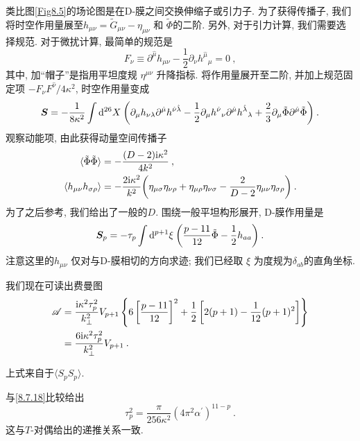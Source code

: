类比图\ref{Fig8.5}的场论图是在D-膜之间交换伸缩子或引力子. 为了获得传播子, 
我们将时空作用量展至$h_{\mu\nu}=\tilde{G}_{\mu\nu}-\eta_{\mu\nu}$ 和 $\tilde{\Phi}$的二阶. 
另外, 对于引力计算, 我们需要选择规范. 对于微扰计算, 最简单的规范是
\begin{equation}
	F_{\nu} \equiv \partial^{\hat{\mu}} h_{\mu \nu}-\frac{1}{2} \partial_{\nu} h^{\hat{\mu}}{}_{\mu}=0 \:, \label{8.7.21}
\end{equation}
其中, 加``帽子''是指用平坦度规 $\eta^{\mu \nu}$ 升降指标. 将作用量展开至二阶, 并加上规范固定项 $-F_{\nu} F^{\hat{\nu}} / 4\kappa^{2}$, 
时空作用量变成
\begin{equation}
	\bm{S}=-\frac{1}{8 \kappa^{2}} \int \mathrm{d}^{26} X \: \biggl( \partial_{\mu} h_{\nu \lambda} 
	\partial^{\hat{\mu}} h^{\hat{\nu} \hat{\lambda}}-\frac{1}{2} \partial_{\mu} h^{\hat{\nu}}{}_{\nu} 
	\partial^{\hat{\mu}} h^{\hat{\lambda}}{}_{\lambda}+\frac{2}{3} \partial_{\mu} \tilde{\Phi} \partial^{\hat{\mu}} \tilde{\Phi}\biggr) \:. \label{8.7.22}
\end{equation}
观察动能项, 由此获得动量空间传播子
\begin{subequations} \label{8.7.23}
\begin{align}
		\langle\tilde{\Phi} \tilde{\Phi}\rangle &=-\frac{(D-2) \mathrm{i} \kappa^{2}}{4 k^{2}}  \:, \label{8.7.23a} \\
		\langle h_{\mu \nu} h_{\sigma \rho}\rangle &=-\frac{2 \mathrm{i} \kappa^{2}}{k^{2}}
		\biggl(\eta_{\mu \sigma} \eta_{\nu \rho}+\eta_{\mu \rho} \eta_{\nu \sigma}-\frac{2}{D-2} \eta_{\mu \nu} \eta_{\sigma \rho}\biggr) \:. \label{8.7.23b}
\end{align}
\end{subequations}
为了之后参考, 我们给出了一般的$D$. 围绕一般平坦构形展开, D-膜作用量是
\begin{equation}
	\bm{S}_{p}=-\tau_{p} \int \mathrm{d}^{p+1} \xi \: \biggl(\frac{p-11}{12} \tilde{\Phi}-\frac{1}{2} h_{aa}\biggr) \:. \label{8.7.24}
\end{equation}
注意这里的$h_{\mu \nu}$ 仅对与D-膜相切的方向求迹; 我们已经取 $\xi$ 为度规为$\delta_{ab}$的直角坐标.

我们现在可读出费曼图
\begin{align}
	\mathscr{A} &= \frac{\mathrm{i} \kappa^{2} \tau_{p}^{2}}{k_{\perp}^{2}} V_{p+1} 
				   \left\{6\left[\frac{p-11}{12}\right]^{2}+\frac{1}{2}\left[2(p+1)-\frac{1}{12}(p+1)^{2}\right]\right\} \nonumber \\
			    & =\frac{6 \mathrm{i} \kappa^{2} \tau_{p}^{2}}{k_{\perp}^{2}} V_{p+1} \:. \label{8.7.25}
\end{align}
\begin{tcolorbox}
	\begin{remark}
		上式来自于$\langle S_p S_p \rangle$.
	\end{remark}	
\end{tcolorbox}
\noindent 与\eqref{8.7.18}比较给出
\begin{equation}
	\tau_{p}^{2} = \frac{\pi}{256 \kappa^{2}} (4 \pi^{2} \alpha^{\prime})^{11-p} \:. \label{8.7.26}
\end{equation}
这与$T$-对偶给出的递推关系一致.

